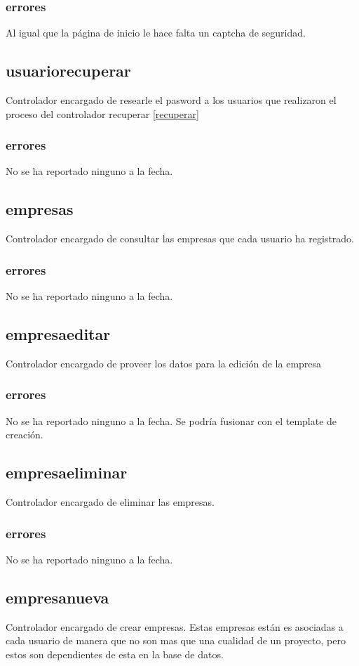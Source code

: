\documentclass[10pt,a4paper]{book}
\begin{document}
	\subsubsection{errores}
	Al igual que la página de inicio le hace falta un captcha de seguridad.
	
	\subsection{usuariorecuperar}
	Controlador encargado de researle el pasword a los usuarios que realizaron el proceso del controlador  recuperar \ref{recuperar}
	\subsubsection{errores}
	No se ha reportado ninguno a la fecha.
	
	\subsection{empresas}
	Controlador encargado de consultar las empresas que cada usuario ha registrado.
	\subsubsection{errores}
	No se ha reportado ninguno a la fecha.
	
	\subsection{empresaeditar}
	Controlador encargado de proveer los datos para la edición de la empresa
	\subsubsection{errores}
	No se ha reportado ninguno a la fecha. Se podría fusionar con el template de creación.
	
	\subsection{empresaeliminar}
	Controlador encargado de eliminar las empresas.
	\subsubsection{errores}
	No se ha reportado ninguno a la fecha.
	
	\subsection{empresanueva}
	Controlador encargado de crear empresas. Estas empresas están es asociadas a cada usuario de manera que no son mas que una cualidad de un proyecto, pero estos son dependientes de esta en la base de datos.
\end{document}
